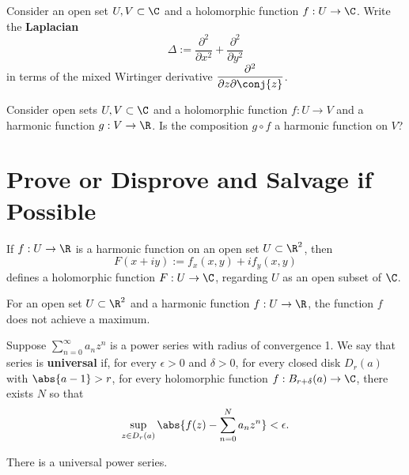 \documentclass{homework}
\begin{document}
\begin{problem}\label{laplacian-via-wirtinger}Consider an open set
  $U, V \subset \C$ and a holomorphic function $f : U \to \C$.  Write
  the \textbf{Laplacian}
  \[
    \Delta := \frac{\partial^2}{\partial x^2} + \frac{\partial^2}{\partial y^2} 
  \]
  in terms of the mixed Wirtinger derivative
  $\displaystyle\frac{\partial^2}{\partial z \partial \conj{z}}$.
\end{problem}

\begin{problem}\label{composition-holomorphic-harmonic}Consider open
  sets $U, V \subset \C$ and a holomorphic function $f : U \to V$ and
  a harmonic function $g : V \to \R$.  Is the composition $g \circ f$
  a harmonic function on $V$?
\end{problem}

\section{Prove or Disprove and Salvage if Possible}

\begin{problem} %
  If $f : U \to \R$ is a harmonic function on an open set $U \subset \R^2$, then 
  \[
    F(x+iy) := f_x(x,y) + i f_y(x,y) 
  \]
  defines a holomorphic function $F : U \to \C$, regarding $U$ as an
  open subset of $\C$.
\end{problem} 

\begin{problem}\label{maximum-principle}For an open set
  $U \subset \R^2$ and a harmonic function $f : U \to \R$, the
  function $f$ does not achieve a maximum. %
\end{problem}

\begin{problem}\label{universal-taylor-series}Suppose
  $\displaystyle\sum_{n=0}^\infty a_n z^n$ is a power series with
  radius of convergence 1.  We say that series is \textbf{universal}
  if, for every $\epsilon > 0$ and $\delta > 0$, for every closed disk
  $D_r(a)$ with $\abs{a-1} > r$, for every holomorphic function
  $f : B_{r + \delta}(a) \to \C$, there exists $N$ so that
  \[
    \sup_{z \in D_r(a)} \abs{ f(z) - \sum_{n=0}^N a_n z^n } < \epsilon.
  \]

  There is a universal power series.
\end{problem}
\end{document}
